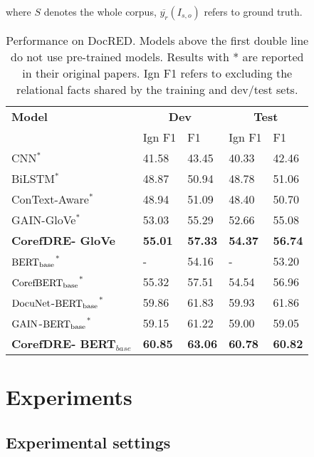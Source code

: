 \documentclass{article}
\begin{document}
where $S$ denotes the whole corpus, $\overline{y_{r}}\left(I_{s, o}\right)$ refers to ground truth.
\begin{table*}[htbp]
\centering
\setlength{\belowcaptionskip}{-0.4cm}
\begin{tabular}{lllll} \toprule
\textbf{Model} & \multicolumn{2}{c}{\textbf{Dev}}&\multicolumn{2}{c}{\textbf{Test}}   \\
\cline{2-5} &    Ign F1 & F1 & Ign F1 & F1  \\
  \midrule
  CNN$^{*}$~\cite{yao2019docred} &  41.58 & 43.45 & 40.33 & 42.46   \\
  BiLSTM$^{*}$~\cite{yao2019docred} &  48.87 & 50.94 & 48.78 & 51.06   \\
  ConText-Aware$^{*}$~\cite{yao2019docred} &  48.94 & 51.09 & 48.40 & 50.70   \\
  GAIN-GloVe$^{*}$~\cite{zeng2020double} &  53.03 & 55.29 & 52.66 & 55.08   \\
  \midrule
  \textbf{CorefDRE- GloVe} &  \textbf{55.01}& \textbf{57.33} & \textbf{54.37} & \textbf{56.74}   \\
  \midrule
  \midrule
  {$\rm BERT_{base}$$^{*}$} ~\cite{wang2019fine} &- &54.16 &- &53.20 \\
  {$\rm CorefBERT_{base}$$^{*}$} ~\cite{ye2020coreferential} & 55.32 & 57.51 & 54.54 & 56.96 \\
  {$\rm DocuNet$-$\rm BERT_{base}$$^{*}$} ~\cite{zhang2021document} & 59.86 & 61.83 & 59.93 & 61.86 \\
  {$\rm GAIN$-$\rm BERT_{base}$$^{*}$} ~\cite{zeng2020double} & 59.15 & 61.22 & 59.00 & 59.05 \\
  \midrule 
\textbf{CorefDRE- BERT$_{base}$} &  \textbf{60.85}& \textbf{63.06} & \textbf{60.78} &\textbf{60.82}   \\
  \bottomrule
  \end{tabular}
  \caption{Performance on DocRED. Models above the first double line do not use pre-trained models. Results with * are reported in their original papers. Ign F1 refers to excluding the relational facts shared by the training and dev/test sets.}
  \label{tab2}
\end{table*}
\section{Experiments}
\subsection{Experimental settings}
\end{document}

